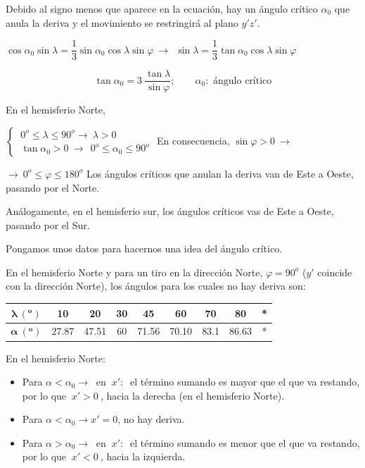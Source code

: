 Debido al signo menos que aparece en la ecuación, hay un ángulo crítico $\alpha_0$ que anula la deriva y el movimiento se restringirá al plano $y'z'$.

$\cos \alpha_0 \sin \lambda = \dfrac 1 3 \sin \alpha_0 \cos \lambda \sin \varphi \ \to \ \ 
 \sin \lambda = \dfrac 1 3 \tan \alpha_0 \cos \lambda \sin \varphi$
 
 $$ \tan \alpha_0=3\ \dfrac {\tan \lambda}{\sin \varphi};\qquad \alpha_0: \text{ ángulo crítico}$$


En el hemisferio Norte, 

$\begin{cases}
\ 0^o\leq \lambda \leq 90^o \to \ \lambda>0 
\\ \ \tan \alpha_0>0 \ \to \ \ 0^o\leq \alpha_0 \leq 90^o
\end{cases}$
En consecuencia, $\sin \varphi>0 \ \to$

$\to \ 0^o\leq \varphi \leq 180^o$ Los ángulos críticos que anulan la deriva van de Este a Oeste, pasando por el Norte.

Análogamente, en el hemisferio sur, los ángulos críticos vas de Este a Oeste, pasando por el Sur.

Pongamos unos datos para hacernos una idea del ángulo crítico. 

En el hemisferio Norte y para un tiro en la dirección Norte, $\varphi = 90^o$ ($y'$ coincide con la dirección Norte), los ángulos para los cuales no hay deriva son:

\begin{table}[H]
\centering
\begin{tabular}{|c|c|c|c|c|c|c|c|c|}
\hline
\textbf{$\boldsymbol{\lambda\ (^o)}$} & 10    & 20    & 30 & 45    & 60    & 70   & 80    & * \\ \hline
\textbf{$\boldsymbol{\alpha\ (^o)}$}  & 27.87 & 47.51 & 60 & 71.56 & 70.10 & 83.1 & 86.63 & * \\ \hline
\end{tabular}
\end{table}

En el hemisferio Norte:
\begin{itemize}
\item Para $\alpha < \alpha_0 \to \ $ en $\ x':\  $ el término sumando es mayor que el que va restando, por lo que $\ x'>0 \ $, hacia la derecha (en el hemisferio Norte).
\item Para  $\alpha < \alpha_0 \to x'=0$, no hay deriva.
\item Para $\alpha > \alpha_0 \to \ $ en $\ x':\  $ el término sumando es menor que el que va restando, por lo que $\ x'<0 \ $, hacia la izquierda.
\end{itemize}


